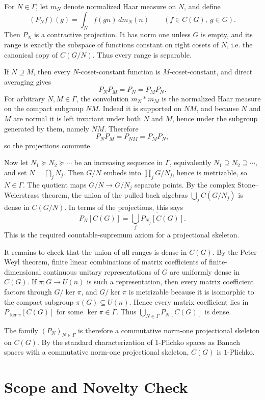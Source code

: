 \documentclass[11pt]{article}
\newcommand{\C}{C}
\begin{document}
For \(N\in\Gamma\), let \(m_N\) denote normalized Haar measure on \(N\), and
define
\[
   (P_N f)(g)=\int_N f(gn)\,dm_N(n)\qquad (f\in \C(G),\ g\in G).
\]
Then \(P_N\) is a contractive projection.  It has norm one unless \(G\) is
empty, and its range is exactly the subspace of functions constant on right
cosets of \(N\), i.e. the canonical copy of \(\C(G/N)\).  Thus every range is
separable.

If \(N\supseteq M\), then every \(N\)-coset-constant function is
\(M\)-coset-constant, and direct averaging gives
\[
   P_NP_M=P_N=P_MP_N .
\]
For arbitrary \(N,M\in\Gamma\), the convolution \(m_N*m_M\) is the normalized
Haar measure on the compact subgroup \(NM\).  Indeed it is supported on
\(NM\), and because \(N\) and \(M\) are normal it is left invariant under both
\(N\) and \(M\), hence under the subgroup generated by them, namely \(NM\).
Therefore
\[
   P_NP_M=P_{NM}=P_MP_N ,
\]
so the projections commute.

Now let \(N_1\succeq N_2\succeq\cdots\) be an increasing sequence in
\(\Gamma\), equivalently \(N_1\supseteq N_2\supseteq\cdots\), and set
\(N=\bigcap_j N_j\).  Then \(G/N\) embeds into \(\prod_j G/N_j\), hence is
metrizable, so \(N\in\Gamma\).  The quotient maps \(G/N\to G/N_j\) separate
points.  By the complex Stone--Weierstrass theorem, the union of the pulled
back algebras \(\bigcup_j \C(G/N_j)\) is dense in \(\C(G/N)\).  In terms of
the projections, this says
\[
   P_N[\C(G)] = \overline{\bigcup_j P_{N_j}[\C(G)]}.
\]
This is the required countable-supremum axiom for a projectional skeleton.

It remains to check that the union of all ranges is dense in \(\C(G)\).  By
the Peter--Weyl theorem, finite linear combinations of matrix coefficients of
finite-dimensional continuous unitary representations of \(G\) are uniformly
dense in \(\C(G)\).  If \(\pi:G\to U(n)\) is such a representation, then every
matrix coefficient factors through \(G/\ker\pi\), and \(G/\ker\pi\) is
metrizable because it is isomorphic to the compact subgroup \(\pi(G)\subseteq
U(n)\).  Hence every matrix coefficient lies in \(P_{\ker\pi}[\C(G)]\) for
some \(\ker\pi\in\Gamma\).  Thus \(\bigcup_{N\in\Gamma}P_N[\C(G)]\) is dense.

The family \((P_N)_{N\in\Gamma}\) is therefore a commutative norm-one
projectional skeleton on \(\C(G)\).  By the standard characterization of
\(1\)-Plichko spaces as Banach spaces with a commutative norm-one
projectional skeleton, \(\C(G)\) is \(1\)-Plichko.

\section*{Scope and Novelty Check}
\end{document}
